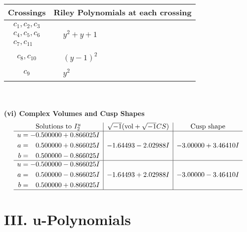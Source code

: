 \documentclass[1p]{elsarticle_modified}
\theoremstyle{definition}
\newcommand{\I}{\sqrt{-1}}
\begin{document}
\begin{tabular}{m{50pt}|m{274pt}}
Crossings & \hspace{64pt}Riley Polynomials at each crossing \\
\hline $$\begin{aligned}c_{1},c_{2},c_{3}\\c_{4},c_{5},c_{6}\\c_{7},c_{11}\end{aligned}$$&$\begin{aligned}
&y^2+y+1
\end{aligned}$\\
\hline $$\begin{aligned}c_{8},c_{10}\end{aligned}$$&$\begin{aligned}
&(y-1)^2
\end{aligned}$\\
\hline $$\begin{aligned}c_{9}\end{aligned}$$&$\begin{aligned}
&y^2
\end{aligned}$\\
\hline
\end{tabular}\\~\\
\newpage\flushleft \textbf{(vi) Complex Volumes and Cusp Shapes}
$$\begin{array}{c|c|c}  
\text{Solutions to }I^u_{2}& \I (\text{vol} + \sqrt{-1}CS) & \text{Cusp shape}\\
 \hline 
\begin{aligned}
u &= -0.500000 + 0.866025 I \\
a &= \phantom{-}0.500000 + 0.866025 I \\
b &= \phantom{-}0.500000 - 0.866025 I\end{aligned}
 & -1.64493 - 2.02988 I & -3.00000 + 3.46410 I \\ \hline\begin{aligned}
u &= -0.500000 - 0.866025 I \\
a &= \phantom{-}0.500000 - 0.866025 I \\
b &= \phantom{-}0.500000 + 0.866025 I\end{aligned}
 & -1.64493 + 2.02988 I & -3.00000 - 3.46410 I\\
 \hline 
 \end{array}$$\newpage
\newpage\renewcommand{\arraystretch}{1}
\centering \section*{ III. u-Polynomials}
\end{document}
